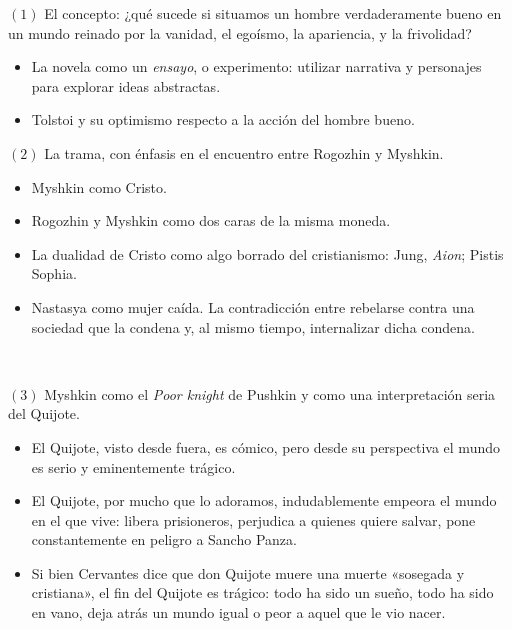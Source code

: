 \documentclass[a4paper, 12pt]{article}
\begin{document}
$(1)$ El concepto: ¿qué sucede si situamos un hombre verdaderamente bueno en un
mundo reinado por la vanidad, el egoísmo, la apariencia, y la frivolidad?

\begin{itemize}
    \item La novela como un \textit{ensayo}, o experimento: utilizar narrativa y
        personajes para explorar ideas abstractas. 
    \item Tolstoi y su optimismo respecto a la acción del hombre bueno.
\end{itemize}

$(2)$ La trama, con énfasis en el encuentro entre Rogozhin y Myshkin. 

\begin{itemize}
    \item Myshkin como Cristo.
    \item Rogozhin y Myshkin como dos caras de la misma moneda.
    \item La dualidad de Cristo como algo borrado del cristianismo: Jung,
        \textit{Aion}; Pistis Sophia.
    \item Nastasya como mujer caída. La contradicción entre rebelarse contra una
        sociedad que la condena y, al mismo tiempo, internalizar dicha condena.
\end{itemize}

~

$(3)$ Myshkin como el \textit{Poor knight} de Pushkin y como una interpretación
seria del Quijote.

\begin{itemize}
    \item El Quijote, visto desde fuera, es cómico, pero desde su perspectiva el
        mundo es serio y eminentemente trágico.
    \item El Quijote, por mucho que lo adoramos, indudablemente empeora el mundo
        en el que vive: libera prisioneros, perjudica a quienes quiere salvar,
        pone constantemente en peligro a Sancho Panza.
    \item Si bien Cervantes dice que don Quijote muere una muerte «sosegada y
        cristiana», el fin del Quijote es trágico: todo ha sido un sueño, todo
        ha sido en vano, deja atrás un mundo igual o peor a aquel que le vio
        nacer.
\end{itemize}
\end{document}
